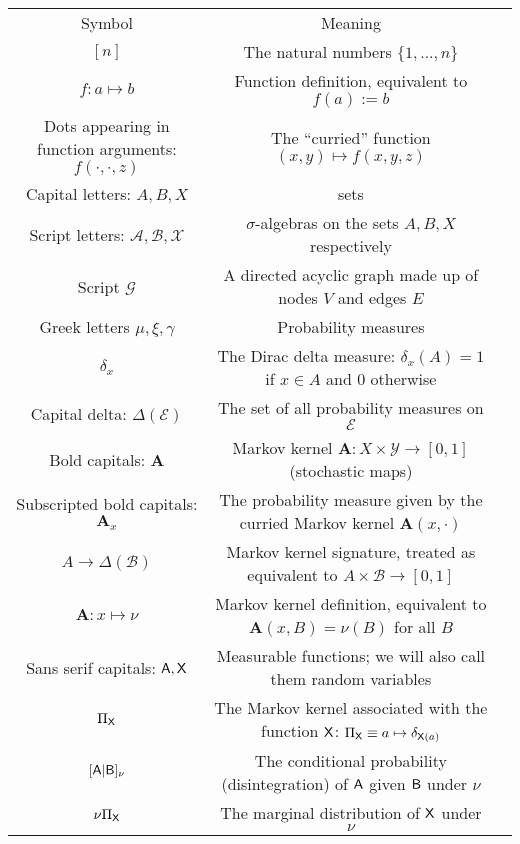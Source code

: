 \begin{center}
\begin{tabular}{ |c|c|c| } 
 \hline
 Symbol & Meaning \\ 
 $[n]$& The natural numbers $\{1,...,n\}$ \\ 
 $f:a\mapsto b$ & Function definition, equivalent to $f(a):=b$\\
 Dots appearing in function arguments: $f(\cdot,\cdot,z)$ & The ``curried'' function $(x, y )\mapsto f(x,y,z)$\\
 Capital letters: $A,B, X$ & sets \\ 
 Script letters: $\mathcal{A},\mathcal{B},\mathcal{X}$ & $\sigma$-algebras on the sets $A, B, X$ respectively\\
 Script $\mathcal{G}$ & A directed acyclic graph made up of nodes $V$ and edges $E$\\
 Greek letters $\mu, \xi, \gamma$ & Probability measures\\
 $\delta_x$ & The Dirac delta measure: $\delta_x(A) = 1$ if $x\in A$ and $0$ otherwise\\
 Capital delta: $\Delta(\mathcal{E})$ & The set of all probability measures on $\mathcal{E}$\\
 Bold capitals: $\mathbf{A}$ & Markov kernel $\mathbf{A}:X\times\mathcal{Y}\to [0,1]$ (stochastic maps)\\
 Subscripted bold capitals: $\mathbf{A}_x$ & The probability measure given by the curried Markov kernel $\mathbf{A}(x,\cdot)$\\
 $A\to\Delta(\mathcal{B})$ & Markov kernel signature, treated as equivalent to $A\times \mathcal{B}\to [0,1]$\\
 $\mathbf{A}:x\mapsto \nu$ & Markov kernel definition, equivalent to $\mathbf{A}(x,B) = \nu(B)$ for all $B$\\
 Sans serif capitals: $\mathsf{A},\mathsf{X}$ & Measurable functions; we will also call them random variables\\
 $\Pi_{\mathsf{X}}$ & The Markov kernel associated with the function $\mathsf{X}$: $\Pi_{\mathsf{X}} \equiv a\mapsto \delta_{\mathsf{X}(a)}$\\
 $[\mathsf{A}|\mathsf{B}]_\nu$ & The conditional probability (disintegration) of $\mathsf{A}$ given $\mathsf{B}$ under $\nu$\\
 $\nu \Pi_{\mathsf{X}}$ & The marginal distribution of $\mathsf{X}$ under $\nu$\\
 \hline
\end{tabular}
\end{center}

